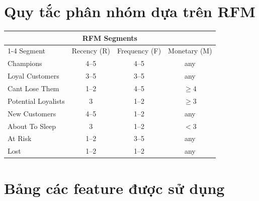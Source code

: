 \documentclass{article}
\begin{document}
\newpage
\begin{appendices}
\section{Quy tắc phân nhóm dựa trên RFM}
\label{app:rfm-groups}

\begin{table}[h]
  \centering
  \begin{tabular}{lccc}
    \toprule
    \multicolumn{4}{c}{RFM Segments} \\
    \cmidrule(r){1-4}
    Segment & Recency (R) & Frequency (F) & Monetary (M) \\
    \midrule
    Champions            & 4--5 & 4--5 & any \\
    Loyal Customers      & 3--5 & 3--5 & any \\
    Cant Lose Them       & 1--2 & 4--5 & $\geq 4$ \\
    Potential Loyalists  & 3    & 1--2 & $\geq 3$ \\
    New Customers        & 4--5 & 1--2 & any \\
    About To Sleep       & 3    & 1--2 & $< 3$ \\
    At Risk              & 1--2 & 3--5 & any \\
    Lost                 & 1--2 & 1--2 & any \\
    \bottomrule
  \end{tabular}
\end{table}

\section{Bảng các feature được sử dụng}
\label{app:feature_details}


\end{appendices}
\end{document}
